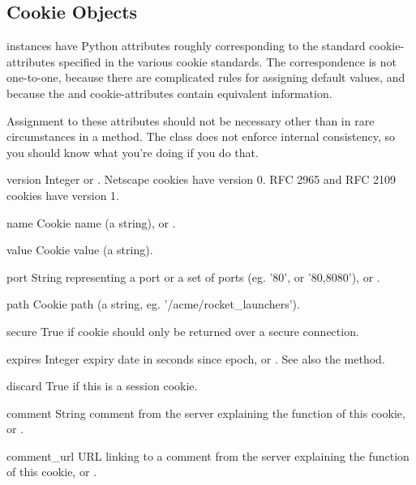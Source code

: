 \subsection{Cookie Objects \label{cookie-jar-objects}}

 instances have Python attributes roughly corresponding
to the standard cookie-attributes specified in the various cookie
standards.  The correspondence is not one-to-one, because there are
complicated rules for assigning default values, and because the
 and  cookie-attributes contain equivalent
information.

Assignment to these attributes should not be necessary other than in
rare circumstances in a  method.  The class does
not enforce internal consistency, so you should know what you're
doing if you do that.

\begin{memberdesc}[Cookie]{version}
Integer or .  Netscape cookies have version 0.  RFC
2965 and RFC 2109 cookies have version 1.
\end{memberdesc}
\begin{memberdesc}[Cookie]{name}
Cookie name (a string), or .
\end{memberdesc}
\begin{memberdesc}[Cookie]{value}
Cookie value (a string).
\end{memberdesc}
\begin{memberdesc}[Cookie]{port}
String representing a port or a set of ports (eg. '80', or '80,8080'),
or .
\end{memberdesc}
\begin{memberdesc}[Cookie]{path}
Cookie path (a string, eg. '/acme/rocket_launchers').
\end{memberdesc}
\begin{memberdesc}[Cookie]{secure}
True if cookie should only be returned over a secure connection.
\end{memberdesc}
\begin{memberdesc}[Cookie]{expires}
Integer expiry date in seconds since epoch, or .  See
also the  method.
\end{memberdesc}
\begin{memberdesc}[Cookie]{discard}
True if this is a session cookie.
\end{memberdesc}
\begin{memberdesc}[Cookie]{comment}
String comment from the server explaining the function of this cookie,
or .
\end{memberdesc}
\begin{memberdesc}[Cookie]{comment_url}
URL linking to a comment from the server explaining the function of
this cookie, or .
\end{memberdesc}

